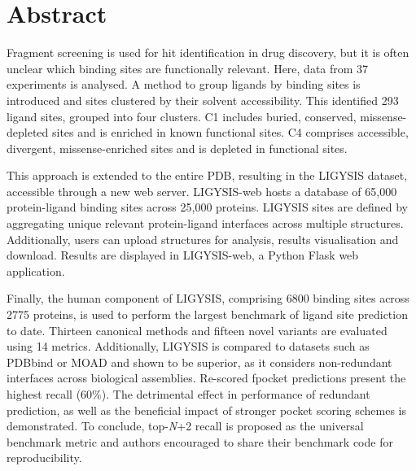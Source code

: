 \chapter*{Abstract} %

Fragment screening is used for hit identification in drug discovery, but it is often unclear which binding sites are functionally relevant. Here, data from 37 experiments is analysed. A method to group ligands by binding sites is introduced and sites clustered by their solvent accessibility. This identified 293 ligand sites, grouped into four clusters. C1 includes buried, conserved, missense-depleted sites and is enriched in known functional sites. C4 comprises accessible, divergent, missense-enriched sites and is depleted in functional sites.

This approach is extended to the entire PDB, resulting in the LIGYSIS dataset, accessible through a new web server. LIGYSIS-web hosts a database of 65,000 protein-ligand binding sites across 25,000 proteins. LIGYSIS sites are defined by aggregating unique relevant protein-ligand interfaces across multiple structures. Additionally, users can upload structures for analysis, results visualisation and download. Results are displayed in LIGYSIS-web, a Python Flask web application.

Finally, the human component of LIGYSIS, comprising 6800 binding sites across 2775 proteins, is used to perform the largest benchmark of ligand site prediction to date. Thirteen canonical methods and fifteen novel variants are evaluated using 14 metrics. Additionally, LIGYSIS is compared to datasets such as PDBbind or MOAD and shown to be superior, as it considers non-redundant interfaces across biological assemblies. Re-scored fpocket predictions present the highest recall (60\%). The detrimental effect in performance of redundant prediction, as well as the beneficial impact of stronger pocket scoring schemes is demonstrated. To conclude, top-\textit{N}+2 recall is proposed as the universal benchmark metric and authors encouraged to share their benchmark code for reproducibility.
